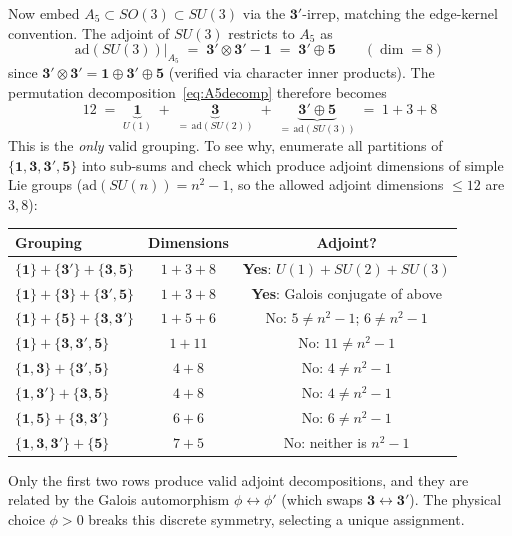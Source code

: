 \documentclass[12pt,a4paper]{article}
\theoremstyle{definition}
\begin{document}
Now embed $A_5\subset SO(3)\subset SU(3)$ via the $\mathbf{3'}$-irrep, matching the edge-kernel convention.  The adjoint of $SU(3)$ restricts to $A_5$ as
\begin{equation}
\mathrm{ad}(SU(3))\big|_{A_5} \;=\; \mathbf{3'}\otimes\mathbf{3'} - \mathbf{1} \;=\; \mathbf{3'} \oplus \mathbf{5}
\qquad (\dim = 8)
\end{equation}
since $\mathbf{3'}\otimes\mathbf{3'} = \mathbf{1}\oplus\mathbf{3'}\oplus\mathbf{5}$ (verified via character inner products).  The permutation decomposition~\eqref{eq:A5decomp} therefore becomes
\begin{equation}
\boxed{12 \;=\; \underbrace{\mathbf{1}}_{U(1)} \;+\; \underbrace{\mathbf{3}}_{=\,\mathrm{ad}(SU(2))} \;+\; \underbrace{\mathbf{3'}\oplus\mathbf{5}}_{=\,\mathrm{ad}(SU(3))} \;=\; 1 + 3 + 8}
\label{eq:gauge138}
\end{equation}
This is the \emph{only} valid grouping.  To see why, enumerate all partitions of $\{\mathbf{1},\mathbf{3},\mathbf{3'},\mathbf{5}\}$ into sub-sums and check which produce adjoint dimensions of simple Lie groups ($\mathrm{ad}(SU(n)) = n^2 - 1$, so the allowed adjoint dimensions $\leq 12$ are $3, 8$):
\begin{center}\small
\begin{tabular}{lcc}
\toprule
\textbf{Grouping} & \textbf{Dimensions} & \textbf{Adjoint?} \\
\midrule
$\{\mathbf{1}\} + \{\mathbf{3'}\} + \{\mathbf{3},\mathbf{5}\}$ & $1 + 3 + 8$ & \textbf{Yes}: $U(1) + SU(2) + SU(3)$ \\
$\{\mathbf{1}\} + \{\mathbf{3}\} + \{\mathbf{3'},\mathbf{5}\}$ & $1 + 3 + 8$ & \textbf{Yes}: Galois conjugate of above \\
$\{\mathbf{1}\} + \{\mathbf{5}\} + \{\mathbf{3},\mathbf{3'}\}$ & $1 + 5 + 6$ & No: $5 \neq n^2\!-\!1$; $6 \neq n^2\!-\!1$ \\
$\{\mathbf{1}\} + \{\mathbf{3},\mathbf{3'},\mathbf{5}\}$ & $1 + 11$ & No: $11 \neq n^2\!-\!1$ \\
$\{\mathbf{1},\mathbf{3}\} + \{\mathbf{3'},\mathbf{5}\}$ & $4 + 8$ & No: $4 \neq n^2\!-\!1$ \\
$\{\mathbf{1},\mathbf{3'}\} + \{\mathbf{3},\mathbf{5}\}$ & $4 + 8$ & No: $4 \neq n^2\!-\!1$ \\
$\{\mathbf{1},\mathbf{5}\} + \{\mathbf{3},\mathbf{3'}\}$ & $6 + 6$ & No: $6 \neq n^2\!-\!1$ \\
$\{\mathbf{1},\mathbf{3},\mathbf{3'}\} + \{\mathbf{5}\}$ & $7 + 5$ & No: neither is $n^2\!-\!1$ \\
\bottomrule
\end{tabular}
\end{center}
Only the first two rows produce valid adjoint decompositions, and they are related by the Galois automorphism $\phi\leftrightarrow\phi'$ (which swaps $\mathbf{3}\leftrightarrow\mathbf{3'}$).  The physical choice $\phi > 0$ breaks this discrete symmetry, selecting a unique assignment.
\end{document}
